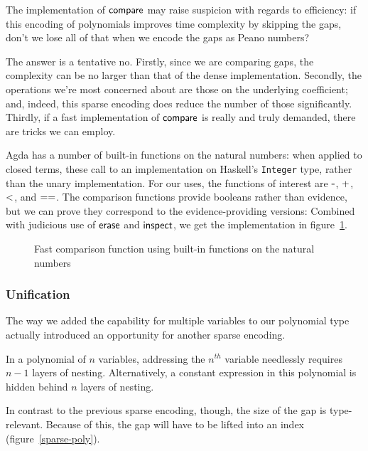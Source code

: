 \documentclass[draft, twocolumn]{article}
\theoremstyle{definition}
\theoremstyle{definition}
\begin{document}

The implementation of \(\AgdaFunction{compare}\) may raise suspicion with
regards to efficiency: if this encoding of polynomials improves time complexity
by skipping the gaps, don't we lose all of that when we encode the gaps as Peano
numbers?

The answer is a tentative no. Firstly, since we are comparing gaps, the
complexity can be no larger than that of the dense implementation. Secondly, the
operations we're most concerned about are those on the underlying coefficient;
and, indeed, this sparse encoding does reduce the number of those significantly.
Thirdly, if a fast implementation of \(\AgdaFunction{compare}\) is really and
truly demanded, there are tricks we can employ.

Agda has a number of built-in functions on the natural numbers: when applied to
closed terms, these call to an implementation on Haskell's \texttt{Integer}
type, rather than the unary implementation. For our uses, the functions of
interest are \(\AgdaFunction{-}\), \(\AgdaFunction{+}\), \(\AgdaFunction{<}\),
and \(\AgdaFunction{==}\). The comparison functions provide booleans rather than
evidence, but we can prove they correspond to the evidence-providing versions:
Combined with judicious use of \(\AgdaFunction{erase}\) and
\(\AgdaFunction{inspect}\), we get the implementation in figure~\ref{fast-cmp}.

\begin{figure}
  \centering
  \caption{Fast comparison function using built-in functions on the natural
    numbers}
  \label{fast-cmp}
\end{figure}
\subsubsection{Unification}
The way we added the capability for multiple variables to our polynomial type
actually introduced an opportunity for another sparse encoding.

In a polynomial of $n$ variables, addressing the $n^{th}$ variable needlessly
requires $n-1$ layers of nesting. Alternatively, a constant expression in this
polynomial is hidden behind $n$ layers of nesting.

In contrast to the previous sparse encoding, though, the size of the gap is
type-relevant. Because of this, the gap will have to be lifted into an index
(figure~\ref{sparse-poly}).
\end{document}
